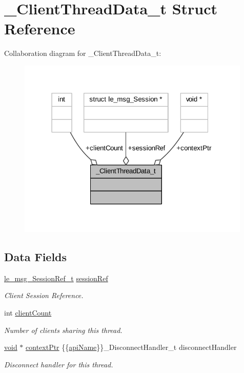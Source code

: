\hypertarget{struct___client_thread_data__t}{}\section{\+\_\+\+Client\+Thread\+Data\+\_\+t Struct Reference}
\label{struct___client_thread_data__t}


Collaboration diagram for \+\_\+\+Client\+Thread\+Data\+\_\+t\+:
\nopagebreak
\begin{figure}[H]
\begin{center}
\leavevmode
\includegraphics[width=315pt]{struct___client_thread_data__t__coll__graph}
\end{center}
\end{figure}
\subsection*{Data Fields}
\begin{DoxyCompactItemize}
\item 
\hyperlink{le__messaging_8h_aebfc01e15b430a5b4f3038a5bd518904}{le\+\_\+msg\+\_\+\+Session\+Ref\+\_\+t} \hyperlink{struct___client_thread_data__t_a8ddf83e8f01adeb51e31004a7077c602}{session\+Ref}
\begin{DoxyCompactList}\small\item\em Client Session Reference. \end{DoxyCompactList}\item 
int \hyperlink{struct___client_thread_data__t_ae71f7d2dc077580e08c02d0367292bb4}{client\+Count}
\begin{DoxyCompactList}\small\item\em Number of clients sharing this thread. \end{DoxyCompactList}\item 
\hyperlink{_t_e_m_p_l_a_t_e__cdef_8h_ac9c84fa68bbad002983e35ce3663c686}{void} $\ast$ \hyperlink{struct___client_thread_data__t_abd0819c42000fb09fa96bdcd69b8e2e7}{context\+Ptr} \{\{\hyperlink{lang_python_2templates_2_t_e_m_p_l_a_t_e__header_8h_a5935280e31093a413da083b98eb0a2c4}{api\+Name}\}\}\+\_\+\+Disconnect\+Handler\+\_\+t disconnect\+Handler
\begin{DoxyCompactList}\small\item\em Disconnect handler for this thread. \end{DoxyCompactList}\end{DoxyCompactItemize}


